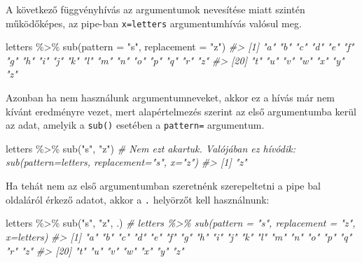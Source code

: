 \documentclass[
]{book}
\newenvironment{Shaded}{\begin{snugshade}}{\end{snugshade}}
\newcommand{\AttributeTok}[1]{\textcolor[rgb]{0.77,0.63,0.00}{#1}}
\newcommand{\CommentTok}[1]{\textcolor[rgb]{0.56,0.35,0.01}{\textit{#1}}}
\newcommand{\FunctionTok}[1]{\textcolor[rgb]{0.00,0.00,0.00}{#1}}
\newcommand{\NormalTok}[1]{#1}
\newcommand{\SpecialCharTok}[1]{\textcolor[rgb]{0.00,0.00,0.00}{#1}}
\newcommand{\StringTok}[1]{\textcolor[rgb]{0.31,0.60,0.02}{#1}}
\begin{document}
A következő függvényhívás az argumentumok nevesítése miatt szintén működőképes, az pipe-ban \texttt{x=letters} argumentumhívás valósul meg.

\begin{Shaded}
\begin{Highlighting}[]
\NormalTok{letters }\SpecialCharTok{\%\textgreater{}\%} \FunctionTok{sub}\NormalTok{(}\AttributeTok{pattern =} \StringTok{"s"}\NormalTok{, }\AttributeTok{replacement =} \StringTok{"z"}\NormalTok{)}
\CommentTok{\#\textgreater{}  [1] "a" "b" "c" "d" "e" "f" "g" "h" "i" "j" "k" "l" "m" "n" "o" "p" "q" "r" "z"}
\CommentTok{\#\textgreater{} [20] "t" "u" "v" "w" "x" "y" "z"}
\end{Highlighting}
\end{Shaded}

Azonban ha nem használunk argumentumneveket, akkor ez a hívás már nem kívánt eredményre vezet, mert alapértelmezés szerint az első argumentumba kerül az adat, amelyik a \texttt{sub()} esetében a \texttt{pattern=} argumentum.

\begin{Shaded}
\begin{Highlighting}[]
\NormalTok{letters }\SpecialCharTok{\%\textgreater{}\%} \FunctionTok{sub}\NormalTok{(}\StringTok{"s"}\NormalTok{, }\StringTok{"z"}\NormalTok{) }\CommentTok{\# Nem ezt akartuk. Valójában ez hívódik: sub(pattern=letters, replacement="s", x="z") }
\CommentTok{\#\textgreater{} [1] "z"}
\end{Highlighting}
\end{Shaded}

Ha tehát nem az első argumentumban szeretnénk szerepeltetni a pipe bal oldaláról érkező adatot, akkor a \texttt{.} helyörzőt kell használnunk:

\begin{Shaded}
\begin{Highlighting}[]
\NormalTok{letters }\SpecialCharTok{\%\textgreater{}\%} \FunctionTok{sub}\NormalTok{(}\StringTok{"s"}\NormalTok{, }\StringTok{"z"}\NormalTok{, .) }\CommentTok{\# letters \%\textgreater{}\% sub(pattern = "s", replacement = "z", x=letters)}
\CommentTok{\#\textgreater{}  [1] "a" "b" "c" "d" "e" "f" "g" "h" "i" "j" "k" "l" "m" "n" "o" "p" "q" "r" "z"}
\CommentTok{\#\textgreater{} [20] "t" "u" "v" "w" "x" "y" "z"}
\end{Highlighting}
\end{Shaded}
\end{document}
